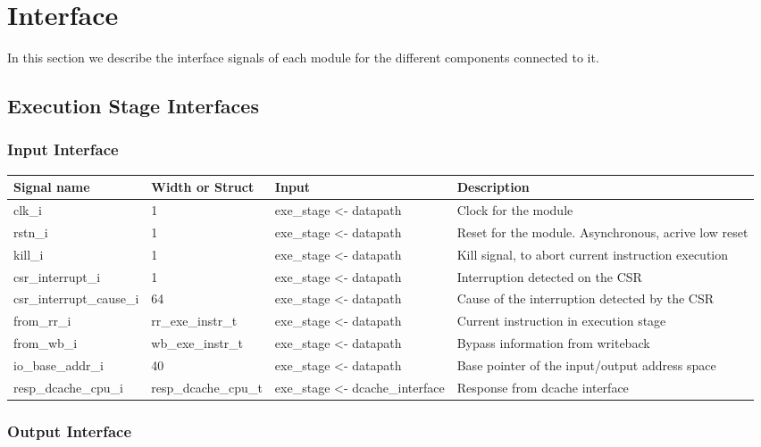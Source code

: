\section{Interface}
\label{chapter 4}

In this section we describe the interface signals of each module for the different components connected to it.

\subsection{Execution Stage Interfaces}

\subsubsection{Input Interface}

\begin{table}[H]
\centering
\begin{tabular}{l|p{3cm}|l|p{4cm}}
\hline
\hline
Signal name & Width or Struct & Input & Description \\
\hline
\hline
clk\_i & 1 & exe\_stage <- datapath & Clock for the module \\
\hline
rstn\_i & 1 & exe\_stage <- datapath & Reset for the module. Asynchronous, acrive low reset \\
\hline
kill\_i & 1 & exe\_stage <- datapath & Kill signal, to abort current instruction execution \\
\hline
csr\_interrupt\_i & 1 & exe\_stage <- datapath & Interruption detected on the CSR \\
\hline
csr\_interrupt\_cause\_i & 64 & exe\_stage <- datapath & Cause of the interruption detected by the CSR \\
\hline
from\_rr\_i & rr\_exe\_instr\_t & exe\_stage <- datapath & Current instruction in execution stage\\
\hline
from\_wb\_i & wb\_exe\_instr\_t & exe\_stage <- datapath & Bypass information from writeback\\
\hline
io\_base\_addr\_i & 40 & exe\_stage <- datapath & Base pointer of the input/output address space \\
\hline
resp\_dcache\_cpu\_i & resp\_dcache\_cpu\_t & exe\_stage <- dcache\_interface & Response from dcache interface \\
\hline
\hline
\end{tabular}
\end{table}


\subsubsection{Output Interface}

